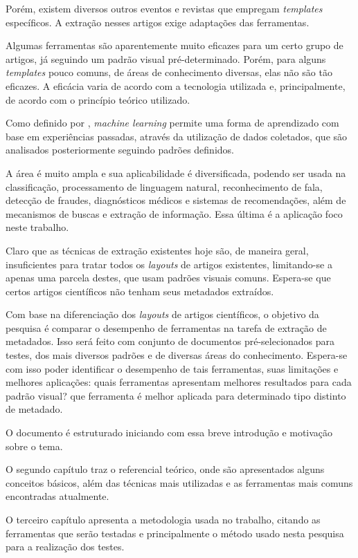 Porém, existem diversos outros eventos e revistas que empregam \textit{templates} específicos. A extração nesses artigos exige adaptações das ferramentas. 

Algumas ferramentas são aparentemente muito eficazes para um certo grupo de artigos, já seguindo um padrão visual pré-determinado. 
Porém, para alguns \textit{templates} pouco comuns, de áreas de conhecimento diversas, elas não são tão eficazes. 
A eficácia varia de acordo com a tecnologia utilizada e, principalmente, de acordo com o princípio teórico utilizado.

Como definido por \cite{foundations-machine-learning}, \textit{machine learning} permite uma forma de aprendizado com base em experiências passadas, através da utilização de dados coletados, que são analisados posteriormente seguindo padrões definidos.

A área é muito ampla e sua aplicabilidade é diversificada, podendo ser usada na classificação, processamento de linguagem natural, reconhecimento de fala, detecção de fraudes, diagnósticos médicos e sistemas de recomendações, 
além de mecanismos de buscas e extração de informação. Essa última é a aplicação foco neste trabalho.

Claro que as técnicas de extração existentes hoje são, de maneira geral, insuficientes para tratar todos os \emph{layouts} de artigos existentes, limitando-se a apenas uma parcela destes, que usam padrões visuais comuns.
Espera-se que certos artigos científicos não tenham seus metadados extraídos.

Com base na diferenciação dos \textit{layouts} de artigos científicos, o objetivo da pesquisa é comparar o desempenho de ferramentas na tarefa de extração de metadados.
Isso será feito com conjunto de documentos pré-selecionados para testes, dos mais diversos padrões e de diversas áreas do conhecimento.
Espera-se com isso poder identificar o desempenho de tais ferramentas, suas limitações e melhores aplicações: quais ferramentas apresentam melhores resultados para cada padrão visual? que ferramenta é melhor aplicada para determinado tipo distinto de metadado.

O documento é estruturado iniciando com essa breve introdução e motivação sobre o tema.

O segundo capítulo traz o referencial teórico, onde são apresentados alguns conceitos básicos, além das técnicas mais utilizadas e as ferramentas mais comuns encontradas atualmente.

O terceiro capítulo apresenta a metodologia usada no trabalho, citando as ferramentas que serão testadas e principalmente o método usado nesta pesquisa para a realização dos testes. 

